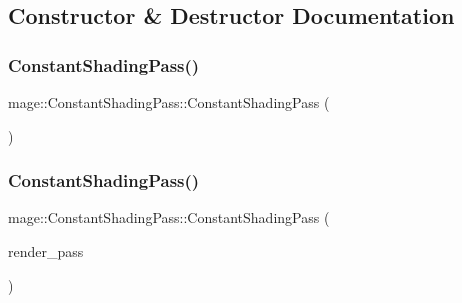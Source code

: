 \subsection{Constructor \& Destructor Documentation}
\hypertarget{classmage_1_1_constant_shading_pass_a21a8614cd67999bec82d260eb9aa78d7}{}\label{classmage_1_1_constant_shading_pass_a21a8614cd67999bec82d260eb9aa78d7} 
\subsubsection{\texorpdfstring{Constant\+Shading\+Pass()}{ConstantShadingPass()}\hspace{0.1cm}{\footnotesize\ttfamily [1/3]}}
{\footnotesize\ttfamily mage\+::\+Constant\+Shading\+Pass\+::\+Constant\+Shading\+Pass (\begin{DoxyParamCaption}{ }\end{DoxyParamCaption})}

\hypertarget{classmage_1_1_constant_shading_pass_a0dd8af518c8f6444368d64f9e24a3a13}{}\label{classmage_1_1_constant_shading_pass_a0dd8af518c8f6444368d64f9e24a3a13} 
\subsubsection{\texorpdfstring{Constant\+Shading\+Pass()}{ConstantShadingPass()}\hspace{0.1cm}{\footnotesize\ttfamily [2/3]}}
{\footnotesize\ttfamily mage\+::\+Constant\+Shading\+Pass\+::\+Constant\+Shading\+Pass (\begin{DoxyParamCaption}\item[{const \hyperlink{classmage_1_1_constant_shading_pass}{Constant\+Shading\+Pass} \&}]{render\+\_\+pass }\end{DoxyParamCaption})\hspace{0.3cm}{\ttfamily [delete]}}

\hypertarget{classmage_1_1_constant_shading_pass_afeb558851130d64579930be81198e946}{}\label{classmage_1_1_constant_shading_pass_afeb558851130d64579930be81198e946} 
